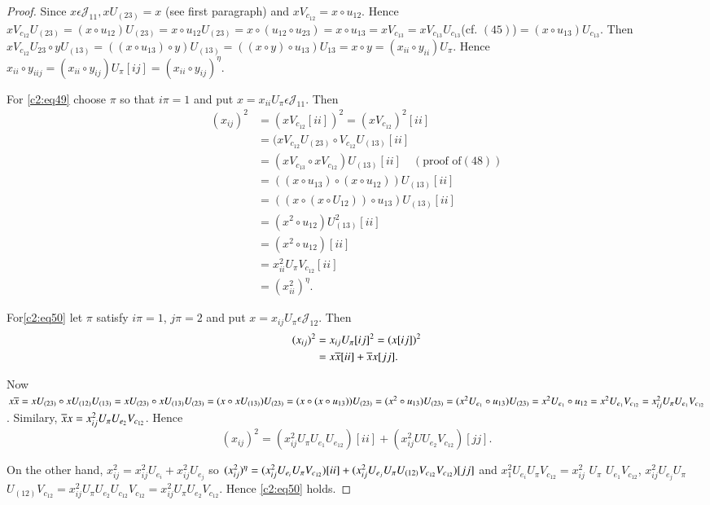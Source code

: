 \begin{proof}
Since $x\epsilon \mathscr{J}_{11}, xU_{(23)}=x$ (see first paragraph)
and $xV_{c_{12}}=x\circ u_{12}$. Hence $xV_{c_{12}}U_{(23)}=(x\circ
u_{12})U_{(23)}=x\circ u_{12}U_{(23)}=x\circ (u_{12}\circ
u_{23})=x\circ
u_{13}=xV_{c_{13}}=xV_{c_{13}}U_{c_{13}}$(cf. $(45)$)$=(x\circ
u_{13})U_{c_{13}}$. Then $xV_{c_{12}}U_{23}\circ yU_{(13)}=((x\circ
u_{13})\circ y)U_{(13)}=((x\circ y)\circ u_{13})U_{13}= x\circ
y=(x_{ii}\circ y_{ii})U_{\pi}$. Hence $x_{ii}\circ
y_{iij}=(x_{ii}\circ y_{ij})U_{\pi}[ij]=(x_{ii}\circ y_{ij})^{\eta}$.

For \eqref{c2:eq49} choose $\pi$ so that $i\pi=1$ and put
$x=x_{ii}U_{\pi}\epsilon \mathscr{J}_{11}$. Then
\begin{align*}
  (x_{ij})^{2}&=(xV_{c_{12}}[ii])^{2}=(x V_{c_{12}})^{2}[ii]\\
  &=(x V_{c_{12}}U_{(23)}\circ V_{c_{12}}U_{(13)}[ii]\\
  &=(xV_{c_{13}}\circ xV_{c_{12}})U_{(13)}[ii]\quad (\text{proof of}
  (48))\\
  &=((x\circ u_{13})\circ (x\circ u_{12}))U_{(13)}[ii]\\
  &=((x \circ(x\circ U_{12}))\circ u_{13})U_{(13)}[ii]\\
  &=(x^{2}\circ u_{12})U^{2}_{(13)}[ii]\\
  &=(x^{2}\circ u_{12})[ii]\\
  &=x^{2}_{ii}U_{\pi}V_{c_{12}}[ii]\\
  &=(x^{2}_{ii})^{\eta}.
\end{align*}

For\pageoriginale \eqref{c2:eq50} let $\pi$ satisfy $i\pi=1$, $j\pi=2$ and put
$x=x_{ij}U_{\pi}\epsilon \mathscr{J}_{12}$. Then
\begin{align*}
  (x_{ij})^{2}&=x_{ij}U_{\pi}[ij]^{2}=(x[ij])^{2}\\
  &= x\overline{x}[ii]+\overline{x} x[jj].
\end{align*}

Now $x\overline{x}=xU_{(23)}\circ xU_{(12)}U_{(13)}=xU_{(23)}\circ
xU_{(13)}U_{(23)}= (x\circ xU_{(13)})U_{(23)}=(x\circ (x\circ
u_{13}))U_{(23)}=(x^{2}\circ u_{13})U_{(23)}=(x^{2}U_{e_1}\circ
u_{13})U_{(23)}=x^{2}U_{e_{1}}\circ
u_{12}=x^{2}U_{e_{1}}V_{c_{12}}=x^{2}_{ij}U_{\pi}U_{e_{1}}V_{c_{12}}$. Similary,
$\overline{x}x=x^{2}_{ij}U_{\pi}U_{e_{2}}V_{c_{12}}$. Hence
$$
(x_{ij})^{2}=(x^{2}_{ij}U_{\pi}U_{e_{1}}U_{e_{12}})[ii]+(x^{2}_{ij}UU_{e_{2}}V_{c_{12}})[jj].
$$

On the other hand,
$x^{2}_{ij}=x^{2}_{ij}U_{e_{i}}+x^{2}_{ij}U_{e_{j}}$ so
$(x^{2}_{ij})^{\eta}=(x^{2}_{ij}U_{e_{i}}U_{\pi}V_{c_{12}})\break [ii] +(x^{2}_{ij}U_{e_{j}}U_{\pi}U_{(12)}V_{c_{12}}V_{c_{12}})[jj]$ 
and
$x^{2}_1U_{e_{i}}U_{\pi}V_{c_{12}}=x^{2}_{ij}$ $U_{\pi}$ $U_{e_{1}}V_{c_{12}}$,
$x^{2}_{ij}U_{e_{j}}U_{\pi}$ $U_{(12)}V_{c_{12}}=x^{2}_{ij}U_{\pi}U_{e_{2}}U_{c_{12}}V_{c_{12}}=x^{2}_{ij}U_{\pi}U_{e_{2}}V_{c_{12}}$. Hence
\eqref{c2:eq50} holds.


\end{proof}
